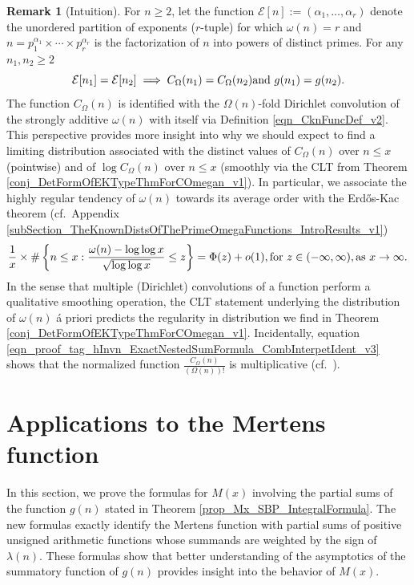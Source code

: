 \documentclass[11pt,reqno,a4letter]{article}
\newcommand{\hlocalref}[1]{\hyperref[#1]{\ref{#1}}}
\numberwithin{equation}{section}
\numberwithin{figure}{section}
\numberwithin{table}{section}
\newcommand{\cf}{cf.~}
\theoremstyle{plain}
\numberwithin{theorem}{section}
\theoremstyle{definition}
\newtheorem{remark}[theorem]{Remark}
\theoremstyle{remark}
\newcommand{\mathtext}[1]{\text{\rm #1}}
\begin{document}
\begin{remark}[Intuition]
\label{remark_COmegaFuncDistIntutitionFromErdosKac_v1}
For $n \geq 2$, let the function 
$\mathcal{E}[n] := (\alpha_1, \ldots, \alpha_r)$ denote the unordered 
partition of exponents ($r$-tuple) for which $\omega(n) = r$ and 
$n = p_1^{\alpha_1} \times \cdots \times p_r^{\alpha_r}$ is the factorization of 
$n$ into powers of distinct primes. 
For any $n_1,n_2 \geq 2$ 
\begin{equation}
\label{eqn_FactSymmPropertyOfgn_v1} 
\mathcal{E}[n_1] = \mathcal{E}[n_2] \implies C_{\Omega}(n_1) = C_{\Omega}(n_2) \mathtext{ and } 
	g(n_1) = g(n_2). 
\end{equation}
The function $C_{\Omega}(n)$ is identified with the $\Omega(n)$-fold 
Dirichlet convolution of the strongly additive $\omega(n)$ with itself via 
Definition \hlocalref{eqn_CknFuncDef_v2}. 
This perspective provides more insight into why we should expect to find a limiting distribution 
associated with the distinct values of 
$C_{\Omega}(n)$ over $n \leq x$ (pointwise) and of $\log C_{\Omega}(n)$ over $n \leq x$ 
(smoothly via the CLT from Theorem \hlocalref{conj_DetFormOfEKTypeThmForCOmegan_v1}). 
In particular, we associate the highly regular tendency of $\omega(n)$ towards its average order 
with the Erd\H{o}s-Kac theorem 
(\cf Appendix \hlocalref{subSection_TheKnownDistsOfThePrimeOmegaFunctions_IntroResults_v1}) 
\[
\frac{1}{x} \times \#\left\{n \leq x: \frac{\omega(n) - \log\log x}{\sqrt{\log\log x}} \leq z\right\} = 
	\Phi(z) + o(1), 
	\mathtext{ for } z \in (-\infty, \infty), 
	\mathtext{ as } x \rightarrow \infty. 
\]
In the sense that multiple (Dirichlet) convolutions of a function 
perform a qualitative smoothing operation, the CLT statement underlying the 
distribution of $\omega(n)$ 
\'a priori predicts the regularity in distribution we find in 
Theorem \hlocalref{conj_DetFormOfEKTypeThmForCOmegan_v1}. 
Incidentally, equation \eqref{eqn_proof_tag_hInvn_ExactNestedSumFormula_CombInterpetIdent_v3} 
shows that the normalized function $\frac{C_{\Omega}(n)}{(\Omega(n))!}$ is multiplicative 
(\cf \cite{ELLIOTT-V1}). 
\end{remark}

\section{Applications to the Mertens function} 
\label{Section_KeyApplications} 
\label{Section_KeyApplications_NewExactFormulasForMx_FullSectionLabel} 

In this section, we prove the formulas for $M(x)$ involving the partial sums 
of the function $g(n)$ stated in 
Theorem \hlocalref{prop_Mx_SBP_IntegralFormula}. 
The new formulas exactly identify the Mertens function with partial sums of 
positive unsigned arithmetic functions whose summands are 
weighted by the sign of $\lambda(n)$. 
These formulas show that better understanding of the 
asymptotics of the summatory function of $g(n)$ 
provides insight into the behavior of $M(x)$. 
\end{document}
